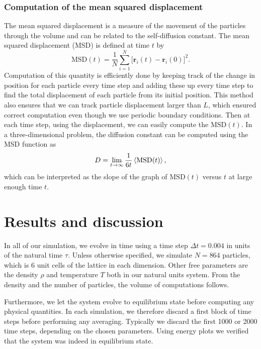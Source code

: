 \documentclass[twoside]{article}
\begin{document}
\subsubsection*{Computation of the mean squared displacement}
The mean squared displacement is a measure of the movement of the particles through the volume and can be related to the self-diffusion constant. The mean squared displacement (MSD) is defined at time $t$ by
\begin{equation}
\mathrm{MSD}(t) = \frac{1}{N} \sum_{i=1}^{N} \Big[\mathbf{r}_i(t) - \mathbf{r}_i(0)\Big]^2.
\end{equation}
Computation of this quantity is efficiently done by keeping track of the change in position for each particle every time step and adding these up every time step to find the total displacement of each particle from its initial position. This method also ensures that we can track particle displacement larger than $L$, which ensured correct computation even though we use periodic boundary conditions. Then at each time step, using the displacement, we can easily compute the $\mathrm{MSD}(t)$.
In a three-dimensional problem, the diffusion constant can be computed using the MSD function as\cite{ref_Al-Matar}
\begin{equation}
D = \lim\limits_{t\rightarrow\infty} \frac{1}{6t} \braket{\mathrm{MSD}(t)},
\end{equation}
which can be interpreted as the slope of the graph of $\mathrm{MSD}(t)$ versus $t$ at large enough time $t$.


\section{Results and discussion}
In all of our simulation, we evolve in time using a time step $\Delta t = 0.004$ in units of the natural time $\tau$. Unless otherwise specified, we simulate $N = 864$ particles, which is 6 unit cells of the lattice in each dimension. Other free parameters are the density $\rho$ and temperature $T$ both in our natural units system. From the density and the number of particles, the volume of computations follows.

Furthermore, we let the system evolve to equilibrium state before computing any physical quantities. In each simulation, we therefore discard a first block of time steps before performing any averaging. Typically we discard the first 1000 or 2000 time steps, depending on the chosen parameters. Using energy plots we verified that the system was indeed in equilibrium state.
\end{document}

